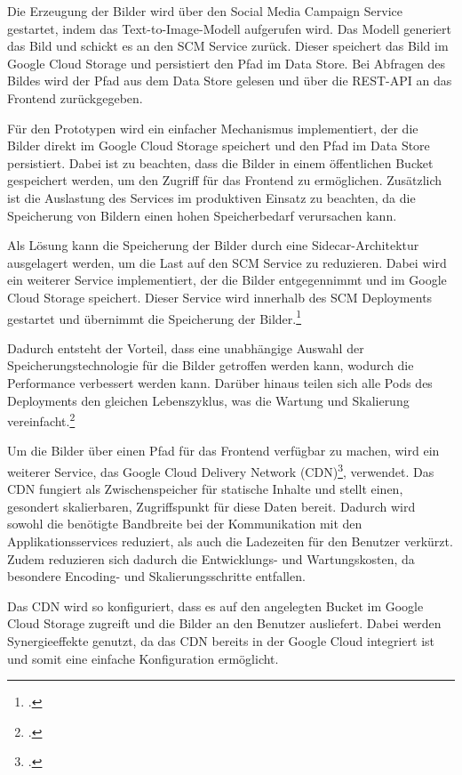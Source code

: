 Die Erzeugung der Bilder wird über den Social Media Campaign Service gestartet, indem das Text-to-Image-Modell aufgerufen wird.
Das Modell generiert das Bild und schickt es an den SCM Service zurück.
Dieser speichert das Bild im Google Cloud Storage und persistiert den Pfad im Data Store.
Bei Abfragen des Bildes wird der Pfad aus dem Data Store gelesen und über die REST-API an das Frontend zurückgegeben.

Für den Prototypen wird ein einfacher Mechanismus implementiert, der die Bilder direkt im Google Cloud Storage speichert und den Pfad im Data Store persistiert.
Dabei ist zu beachten, dass die Bilder in einem öffentlichen Bucket gespeichert werden, um den Zugriff für das Frontend zu ermöglichen.
Zusätzlich ist die Auslastung des Services im produktiven Einsatz zu beachten, da die Speicherung von Bildern einen hohen Speicherbedarf verursachen kann.

Als Lösung kann die Speicherung der Bilder durch eine Sidecar-Architektur ausgelagert werden, um die Last auf den SCM Service zu reduzieren.
Dabei wird ein weiterer Service implementiert, der die Bilder entgegennimmt und im Google Cloud Storage speichert.
Dieser Service wird innerhalb des SCM Deployments gestartet und übernimmt die Speicherung der Bilder.\footcite{microsoft_sidecar_pattern}

Dadurch entsteht der Vorteil, dass eine unabhängige Auswahl der Speicherungstechnologie für die Bilder getroffen werden kann, wodurch die Performance verbessert werden kann.
Darüber hinaus teilen sich alle Pods des Deployments den gleichen Lebenszyklus, was die Wartung und Skalierung vereinfacht.\footcite{kubernetes_sidecar_containers}

Um die Bilder über einen Pfad für das Frontend verfügbar zu machen, wird ein weiterer Service, das Google Cloud Delivery Network (CDN)\footcite{google_cloud_cdn_overview}, verwendet.
Das CDN fungiert als Zwischenspeicher für statische Inhalte und stellt einen, gesondert skalierbaren, Zugriffspunkt für diese Daten bereit.
Dadurch wird sowohl die benötigte Bandbreite bei der Kommunikation mit den Applikationsservices reduziert, als auch die Ladezeiten für den Benutzer verkürzt.
Zudem reduzieren sich dadurch die Entwicklungs- und Wartungskosten, da besondere Encoding- und Skalierungsschritte entfallen.

Das CDN wird so konfiguriert, dass es auf den angelegten Bucket im Google Cloud Storage zugreift und die Bilder an den Benutzer ausliefert.
Dabei werden Synergieeffekte genutzt, da das CDN bereits in der Google Cloud integriert ist und somit eine einfache Konfiguration ermöglicht.


